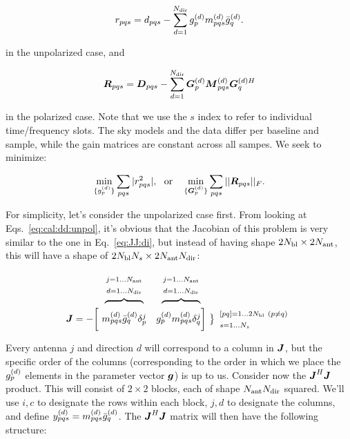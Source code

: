 \documentclass[useAMS,usenatbib]{mn2e}
\newcommand{\mat}[1]{{\bmath{#1}}}
\newcommand{\JJ}{\mat{J}} %
\newcommand{\DD}{\mat{D}}
\newcommand{\RR}{\mat{R}}
\newcommand{\JHJ}{\JJ^H\JJ} %
\begin{document}
\begin{equation}
\label{eq:cal:dd:unpol}
r_{pqs} = d_{pqs} - \sum_{d=1}^{N_\mathrm{dir}} g^{(d)}_p m^{(d)}_{pqs} \bar{g}^{(d)}_q.
\end{equation}

in the unpolarized case, and

\begin{equation}
\label{eq:cal:dd:pol}
\RR_{pqs} = \DD_{pqs} - \sum_{d=1}^{\Nd} \GGd_p \MMd_{pqs} \GGdH_q
\end{equation}

in the polarized case. Note that we use the $s$ index to refer to individual time/frequency slots. The sky models and the 
data differ per baseline and sample, while the gain matrices are constant across all sampes. We seek to minimize:


\[
\min_{\{\ggd_p\}}\sum_{pqs}|r^2_{pqs}|,~~\mathrm{or}~~~\min_{\{\GGd_p\}}\sum_{pqs}||\RR_{pqs}||_F.
\]

For simplicity, let's consider the unpolarized case first. From looking at Eqs.~\ref{eq:cal:dd:unpol}, it's obvious that the 
Jacobian of this problem is very similar to the one 
in Eq.~\ref{eq:JJ:di}, but instead of having shape $2N_\mathrm{bl}\times2N_\mathrm{ant}$, this will have a 
shape of $2N_\mathrm{bl}N_s\times 2N_\mathrm{ant}N_\mathrm{dir}$:

\[
\begin{array}{r@{~}cc@{~}cc}
 & \overbrace{~~~~~~~~~~~~}^{\Stack{\scriptstyle j=1\dots \Na\\\scriptstyle d=1\dots \Nd}} & 
   \overbrace{~~~~~~~~~~~~}^{\Stack{\scriptstyle j=1\dots \Na\\\scriptstyle d=1\dots \Nd}} \\
\JJ = - \bigg [ &
  \mmd_{pqs}\ggdH_q \delta^j_p & 
  \ggd_p \mmd_{pqs}  \delta^j_q 
\bigg ] &
\big \}
\begin{array}{l}
\scriptstyle [pq]=1\dots 2\Nbl~(p\ne q)\\ \scriptstyle s=1\dots\Ns
\end{array}

\end{array}
\]

Every antenna $j$ and direction $d$ will correspond to a column in $\JJ$, but the specific order of the columns 
(corresponding to the order in which we place the $g^{(d)}_p$ elements in the parameter vector $\bmath{g}$)
is up to us. Consider now the $\JHJ$ product. This will consist of $2\times2$ blocks, each of shape 
$N_\mathrm{ant}N_\mathrm{dir}$ squared. We'll use $i,c$ to designate the rows within each block, $j,d$ to designate the columns, 
and define $y^{(d)}_{pqs}=m^{(d)}_{pqs}\bar{g}^{(d)}_q$. The $\JHJ$ matrix will then have the following structure:
\end{document}
